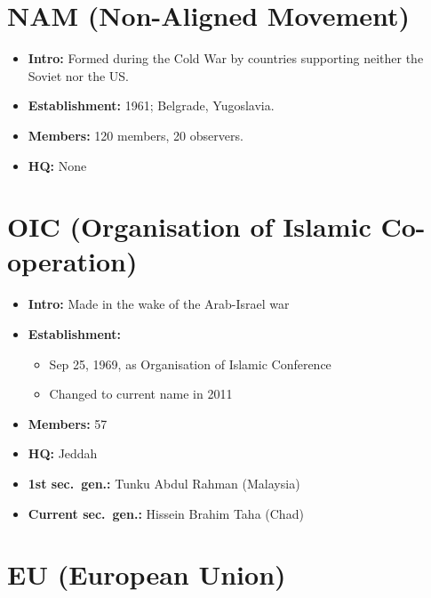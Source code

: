 \documentclass[
  12pt,
]{article}
\providecommand{\tightlist}{%
  \setlength{\itemsep}{0pt}\setlength{\parskip}{0pt}}
\begin{document}
\hypertarget{nam-non-aligned-movement}{%
\section{NAM (Non-Aligned Movement)}\label{nam-non-aligned-movement}}

\begin{itemize}
\tightlist
\item
  \textbf{Intro:} Formed during the Cold War by countries supporting
  neither the Soviet nor the US.
\item
  \textbf{Establishment:} 1961; Belgrade, Yugoslavia.
\item
  \textbf{Members:} 120 members, 20 observers.
\item
  \textbf{HQ:} None
\end{itemize}

\hypertarget{oic-organisation-of-islamic-co-operation}{%
\section{OIC (Organisation of Islamic
Co-operation)}\label{oic-organisation-of-islamic-co-operation}}

\begin{itemize}
\tightlist
\item
  \textbf{Intro:} Made in the wake of the Arab-Israel war
\item
  \textbf{Establishment:}

  \begin{itemize}
  \tightlist
  \item
    Sep 25, 1969, as Organisation of Islamic Conference
  \item
    Changed to current name in 2011
  \end{itemize}
\item
  \textbf{Members:} 57
\item
  \textbf{HQ:} Jeddah
\item
  \textbf{1st sec.~gen.:} Tunku Abdul Rahman (Malaysia)
\item
  \textbf{Current sec.~gen.:} Hissein Brahim Taha (Chad)
\end{itemize}

\hypertarget{eu-european-union}{%
\section{EU (European Union)}\label{eu-european-union}}
\end{document}
